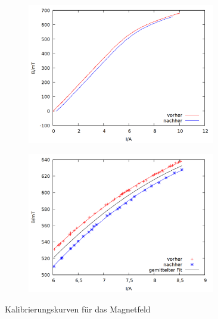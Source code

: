 \begin{figure}[h]
  \centering
  \begin{subfigure}[h]{0.5\textwidth}
    \centering
    \includegraphics[width=0.9\textwidth]{data/zeeman/out_kalibrierung.png}
    \label{fig:kal_raw}
  \end{subfigure}%
  \begin{subfigure}[h]{0.5\textwidth}
    \centering
    \includegraphics[width=0.9\textwidth]{data/zeeman/out_kalibrierung_edit.png}
    \label{fig:kal_raw_edit}
  \end{subfigure}
  \caption{Kalibrierungskurven für das Magnetfeld}
\end{figure}

